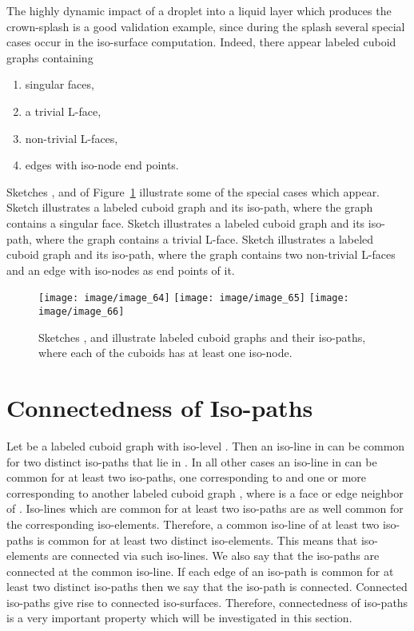 \documentclass[a4paper,11pt]{article}
\begin{document}
The highly dynamic impact of a droplet into a liquid layer which produces the crown-splash is a good
validation example, since during the splash several special cases occur in the iso-surface computation.
Indeed, there appear labeled cuboid graphs  containing
\begin{enumerate}
\item singular faces,
\item a trivial L-face,
\item non-trivial L-faces,
\item edges with iso-node end points.
\end{enumerate}

Sketches ,  and  of Figure~\ref{image_64_65_66} illustrate some of the special
cases which appear. Sketch  illustrates a labeled cuboid graph and its iso-path, where the graph
contains a singular face. Sketch  illustrates a labeled cuboid graph and its iso-path, where the
graph contains a trivial L-face. Sketch  illustrates a labeled cuboid graph and its iso-path, where
the graph contains two non-trivial L-faces and an edge with iso-nodes as end points of it.
\begin{figure}[!ht]
\texttt{[image: image/image\_64]}\hspace{2cm}
\texttt{[image: image/image\_65]}\hspace{2cm}
\texttt{[image: image/image\_66]}
\caption{Sketches ,  and  illustrate labeled cuboid graphs and their iso-paths, where each of the
cuboids has at least one iso-node.}
\label{image_64_65_66}
\end{figure}
\FloatBarrier

\section{Connectedness of Iso-paths}
Let  be a labeled cuboid graph with iso-level . Then an iso-line in 
can be common for two distinct iso-paths that lie in . In all other cases an iso-line in 
can be common for at least two iso-paths, one corresponding to  and one or more corresponding to another
labeled cuboid graph , where  is a face or edge neighbor of . Iso-lines which
are common for at least two iso-paths are as well common for the corresponding iso-elements. Therefore,
a common iso-line of at least two iso-paths is common for at least two distinct iso-elements. This means
that iso-elements are connected via such iso-lines. We also say that the iso-paths are connected at
the common iso-line. If each edge of an iso-path is common for at least two distinct iso-paths then
we say that the iso-path is connected. Connected iso-paths give rise to connected iso-surfaces. Therefore,
connectedness of iso-paths is a very important property which will be investigated in this section.
\end{document}
